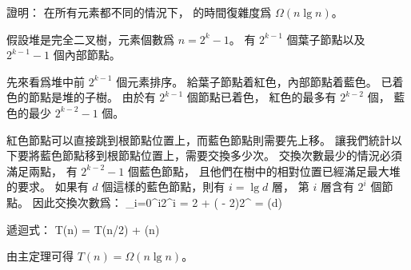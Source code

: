 \startEXERCISE\DIFFICULT
證明： 在所有元素都不同的情況下，  的時間復雜度爲 $\Omega(n\lg{n})$。
\stopEXERCISE

\startANSWER
假設堆是完全二叉樹，元素個數爲 $n=2^k - 1$。
有 $2^{k-1}$ 個葉子節點以及 $2^{k-1} - 1$ 個內部節點。

先來看爲堆中前 $2^{k-1}$ 個元素排序。
給葉子節點着紅色，內部節點着藍色。
已着色的節點是堆的子樹。
由於有 $2^{k-1}$ 個節點已着色，
紅色的最多有 $2^{k-2}$ 個，
藍色的最少 $2^{k-2}-1$ 個。

紅色節點可以直接跳到根節點位置上，而藍色節點則需要先上移。
讓我們統計以下要將藍色節點移到根節點位置上，需要交換多少次。
交換次數最少的情況必須滿足兩點，
有 $2^{k-2} -1$ 個藍色節點，
且他們在樹中的相對位置已經滿足最大堆的要求。
如果有 $d$ 個這樣的藍色節點，則有 $i=\lg{d}$ 層，
第 $i$ 層含有 $2^i$ 個節點。
因此交換次數爲：
\startformula
\sum_{i=0}^{}i2^i = 2 + ( - 2)2^{} = \Omega(d)
\stopformula

遞迴式：
\startformula
T(n) = T(n/2) + \Omega(n)
\stopformula

由主定理可得 $T(n)=\Omega(n\lg{n})$。
\stopANSWER

\stopsection

